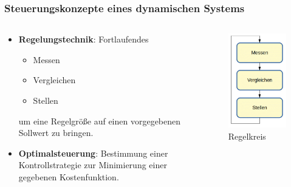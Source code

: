 \documentclass{beamer}
\begin{document}
		\begin{frame}
			\frametitle{Steuerungskonzepte eines dynamischen Systems}
			\begin{columns}
				\begin{column}{0.58\textwidth}
					\begin{itemize}
						\item \textbf{Regelungstechnik}: Fortlaufendes
							\begin{itemize}
								\item Messen
								\item Vergleichen
								\item Stellen
							\end{itemize}
							um eine Regelgröße auf einen vorgegebenen Sollwert zu bringen. 
						\item \textbf{Optimalsteuerung}: Bestimmung einer Kontrollstrategie zur Minimierung einer gegebenen Kostenfunktion.
					\end{itemize}
				\end{column}
				\begin{column}{0.48\textwidth}
					\begin{figure}
						\includegraphics[scale = 0.25]{images/regelkreis.jpg}
						\caption{Regelkreis}
					\end{figure}
				\end{column}
			\end{columns}
		\end{frame}
\end{document}
